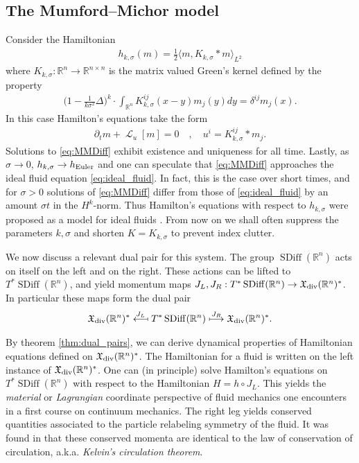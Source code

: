 \documentclass[12pt]{amsart}
\newcommand{\R}{\ensuremath{\mathbb{R}}}
\DeclareMathOperator{\SDiff}{SDiff}
\DeclareMathOperator{\lie}{\mathcal{L}}
\begin{document}
\subsection{The Mumford--Michor model}
\label{sec:MME}
Consider the Hamiltonian
\begin{align*}
  h_{k,\sigma}(m) = \frac{1}{2} \langle m , K_{k,\sigma} * m \rangle_{L^2} 
\end{align*}
where $K_{k,\sigma}:\R^n \to \mathbb{R}^{n \times n}$ is the matrix
valued Green's kernel defined by the property
\begin{align*}
 \Big(1 - \frac{1}{k \sigma^2} \Delta \Big)^k \cdot \int_{\R^n} K_{k,\sigma}^{ij}(x - y) m_j(y) dy = \delta^{ij} m_j(x).
\end{align*}
In this case Hamilton's equations take the form
\begin{align}
	\partial_t m+ \lie_u [ m] = 0 \quad , \quad u^i  = K^{ij}_{k,\sigma} * m_j. \label{eq:MMDiff}
\end{align}
Solutions to \eqref{eq:MMDiff} exhibit existence and uniqueness for all time.
Lastly, as $\sigma \to 0$, $h_{k,\sigma} \to h_{\rm Euler}$ and one can speculate that \eqref{eq:MMDiff}
approaches the ideal fluid equation \eqref{eq:ideal_fluid}.
In fact, this is the case over short times, and for $\sigma > 0$ solutions of \eqref{eq:MMDiff}
differ from those of \eqref{eq:ideal_fluid} by an amount $\sigma t$
in the $H^k$-norm.
Thus Hamilton's equations with respect to $h_{k,\sigma}$ were proposed
as a model for ideal fluids \cite[Theorems 2 and 3]{MumfordMichor2013}. From now on we shall often suppress the
parameters $k,\sigma$ and shorten $K = K_{k,\sigma}$ to prevent index
clutter.

We now discuss a relevant dual pair for this system.
The group $\SDiff(\R^n)$ acts on itself on the left and on the right.
These actions can be lifted to $T^* \SDiff(\R^n)$, and yield
momentum maps $J_L,J_R : T^*\SDiff(\R^n) \to \mathfrak{X}_{\rm div}(\R^n)^*$. In particular these maps form the dual pair
\begin{align*}
  \mathfrak{X}_{\rm div}(\R^n)^*
  \stackrel{J_L}{\longmapsfrom}
  T^* \SDiff(\R^n)
  \stackrel{J_R}{\longmapsto}
  \mathfrak{X}_{\rm div}(\R^n)^*.
\end{align*}

By theorem \ref{thm:dual_pairs}, we can derive dynamical properties of Hamiltonian equations defined on $\mathfrak{X}_{\rm div}(\R^n)^*$.
The Hamiltonian for a fluid is written on the left instance of $\mathfrak{X}_{\rm div}(\R^n)^*$.
One can (in principle) solve Hamilton's equations on $T^*\SDiff(\R^n)$
with respect to the Hamiltonian $H = h \circ J_L$.
This yields the \emph{material} or \emph{Lagrangian} coordinate perspective
of fluid mechanics one encounters in a first course on continuum
mechanics.
The right leg yields conserved quantities associated to the particle relabeling symmetry of the fluid.
It was found in \cite{Arnold1966} that these conserved momenta are identical
to the law of conservation of circulation, a.k.a. \emph{Kelvin's circulation theorem}.
\end{document}
